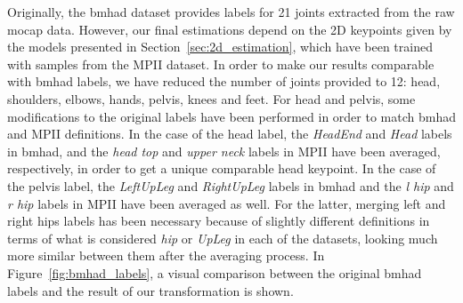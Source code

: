 Originally, the \gls{bmhad} dataset provides labels for 21 joints extracted from the raw \gls{mocap} data. However, our final estimations depend on the 2D keypoints given by the models presented in Section~\ref{sec:2d_estimation}, which have been trained with samples from the MPII dataset. In order to make our results comparable with \gls{bmhad} labels, we have reduced the number of joints provided to 12: head, shoulders, elbows, hands, pelvis, knees and feet. For head and pelvis, some modifications to the original labels have been performed in order to match \gls{bmhad} and MPII definitions. In the case of the head label, the \textit{HeadEnd} and \textit{Head} labels in \gls{bmhad}, and the \textit{head top} and \textit{upper neck} labels in MPII  have been averaged, respectively, in order to get a unique comparable head keypoint. In the case of the pelvis label, the \textit{LeftUpLeg} and \textit{RightUpLeg} labels in \gls{bmhad} and the \textit{l hip} and \textit{r hip} labels in MPII have been averaged as well. For the latter, merging left and right hips labels has been necessary because of slightly different definitions in terms of what is considered \textit{hip} or \textit{UpLeg} in each of the datasets, looking much more similar between them after the averaging process. In Figure~\ref{fig:bmhad_labels}, a visual comparison between the original \gls{bmhad} labels and the result of our transformation is shown.

